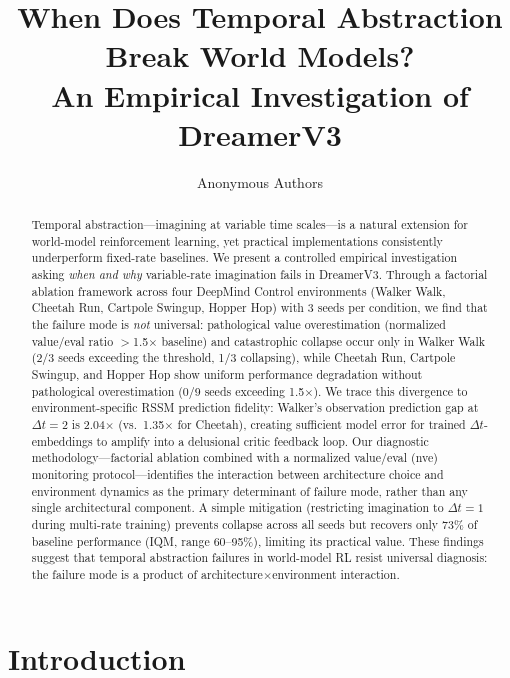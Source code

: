 \documentclass[10pt,letterpaper]{article}
\title{When Does Temporal Abstraction Break World Models?\\ An Empirical Investigation of DreamerV3}
\author{
Anonymous Authors
}
\date{}
\begin{document}
\maketitle

\begin{abstract}
Temporal abstraction---imagining at variable time scales---is a natural extension for world-model reinforcement learning, yet practical implementations consistently underperform fixed-rate baselines. We present a controlled empirical investigation asking \emph{when and why} variable-rate imagination fails in DreamerV3. Through a factorial ablation framework across four DeepMind Control environments (Walker Walk, Cheetah Run, Cartpole Swingup, Hopper Hop) with 3 seeds per condition, we find that the failure mode is \emph{not} universal: pathological value overestimation (normalized value/eval ratio $>$1.5$\times$ baseline) and catastrophic collapse occur only in Walker Walk (2/3 seeds exceeding the threshold, 1/3 collapsing), while Cheetah Run, Cartpole Swingup, and Hopper Hop show uniform performance degradation without pathological overestimation (0/9 seeds exceeding 1.5$\times$). We trace this divergence to environment-specific RSSM prediction fidelity: Walker's observation prediction gap at $\Delta t{=}2$ is 2.04$\times$ (vs.\ 1.35$\times$ for Cheetah), creating sufficient model error for trained $\Delta t$-embeddings to amplify into a delusional critic feedback loop. Our diagnostic methodology---factorial ablation combined with a normalized value/eval (nve) monitoring protocol---identifies the interaction between architecture choice and environment dynamics as the primary determinant of failure mode, rather than any single architectural component. A simple mitigation (restricting imagination to $\Delta t{=}1$ during multi-rate training) prevents collapse across all seeds but recovers only 73\% of baseline performance (IQM, range 60--95\%), limiting its practical value. These findings suggest that temporal abstraction failures in world-model RL resist universal diagnosis: the failure mode is a product of architecture$\times$environment interaction.
\end{abstract}

\section{Introduction}
\label{sec:intro}
\end{document}
